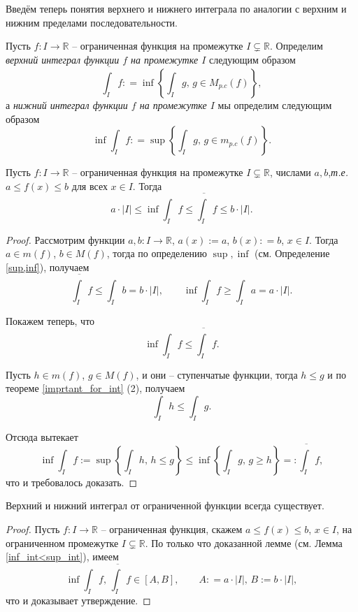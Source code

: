 Введём теперь понятия верхнего и нижнего интеграла по аналогии с верхним и нижним пределами последовательности.

\begin{definition}\label{Riemann_int}
 Пусть $f: I \to \mathbb{R}$ -- ограниченная функция на промежутке $I \subsetneq \mathbb{R}$. Определим \textit{верхний интеграл функции $f$ на промежутке $I$} следующим образом
 \[
      \overline{ \int_I} f  : = \inf  \left\{ \int_I g  , \, g \in M_{p.c}(f)\right\},
 \]
 а \textit{нижний интеграл функции $f$ на промежутке $I$} мы определим следующим образом
 \[
  \inf \int_I f  : = \sup  \left\{ \int_I g  , \, g \in m_{p.c}(f) \right\}.
 \]
\end{definition}

\begin{lemma}\label{inf_int<sup_int}
    Пусть $f:I \to \mathbb{R}$ -- ограниченная функция на промежутке $I \subsetneq \mathbb{R}$, числами $a,b$,\textit{т.е.} $a \le f(x) \le b$ для всех $x \in I$. Тогда
    \[
     a\cdot |I| \le \inf \int_I f  \le \overline{\int_I} f \le b \cdot |I|.
    \]
\end{lemma}
\begin{proof}
    Рассмотрим функции $a,b:I \to \mathbb{R}$, $a(x) := a$, $b(x): =b$, $x\in I$. Тогда $a \in m(f)$, $b \in M(f)$, тогда по определению $\sup, \inf$ (см. Определение \ref{sup,inf}), получаем
    \[
     \overline{\int_I} f\le \int_I b = b \cdot |I|, \qquad \inf \int_I f \ge \int_I a = a\cdot |I|.
    \]

Покажем теперь, что 
    $$\inf \int_I f \le \overline{\int_I} f.$$
    
Пусть $h\in m(f)$, $g\in M(f)$, и они -- ступенчатые функции, тогда $h \le g$ и по теореме \ref{imprtant_for_int} (2), получаем 
$$
\int_I h \le \int_I g.
$$

Отсюда вытекает
    \[
     \inf \int_I f :=\sup \left\{ \int_I h, \, h \le g \right\} \le \inf \left\{ \int_I g,\, g \ge h\right\} =: \overline{\int_I}f,
    \]
    что и требовалось доказать.
\end{proof}

\begin{corollary}
 Верхний и нижний интеграл от ограниченной функции всегда существует.
\end{corollary}

\begin{proof} Пусть $f:I \to \mathbb{R}$ -- ограниченная функция, скажем $a\le f(x) \le b$, $x \in I$, на ограниченном промежутке $I \subsetneq \mathbb{R}$. По только что доказанной лемме (см. Лемма \ref{inf_int<sup_int}), имеем
\[
 \inf \int_I f, \,\overline{\int_I}f \in [A,B], \qquad A: = a \cdot |I|, \, B:=b\cdot |I|,
\]
что и доказывает утверждение.
\end{proof}



